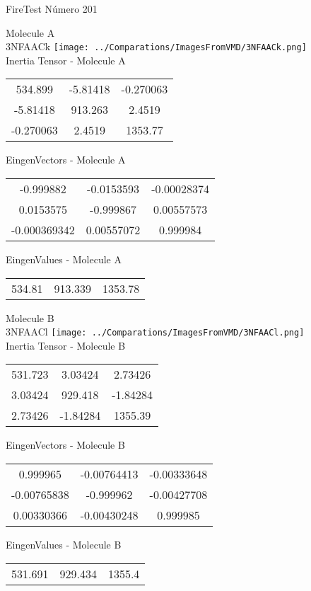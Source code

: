 \vtab[-2cm]
\begin{center}
{\large FireTest \tab Número 201}
\end{center}
\begin{multicols}{2}
\begin{center}

Molecule A \\ 
3NFAACk
\texttt{[image: ../Comparations/ImagesFromVMD/3NFAACk.png]}
\\
Inertia Tensor - Molecule A \\
\vtab

\begin{tabular}{|c c c|}
534.899	 & 	-5.81418	 & 	-0.270063	 \\
-5.81418	 & 	913.263	 & 	2.4519	 \\
-0.270063	 & 	2.4519	 & 	1353.77
\end{tabular}

\vtab
 EingenVectors - Molecule A     \\
\vtab
\begin{tabular}{|c c c|}
-0.999882	 & 	-0.0153593	 & 	-0.00028374	 \\
0.0153575	 & 	-0.999867	 & 	0.00557573	 \\
-0.000369342	 & 	0.00557072	 & 	0.999984
\end{tabular}

\vtab
 EingenValues - Molecule A     \\
\vtab
\begin{tabular}{|c c c|}
534.81	 & 	913.339	 & 	1353.78	 \\
\end{tabular}
\columnbreak

Molecule B \\ 
3NFAACl
\texttt{[image: ../Comparations/ImagesFromVMD/3NFAACl.png]}
\\
Inertia Tensor - Molecule B \\
\vtab

\begin{tabular}{|c c c|}
531.723	 & 	3.03424	 & 	2.73426	 \\
3.03424	 & 	929.418	 & 	-1.84284	 \\
2.73426	 & 	-1.84284	 & 	1355.39
\end{tabular}

\vtab
 EingenVectors - Molecule B     \\
\vtab
\begin{tabular}{|c c c|}
0.999965	 & 	-0.00764413	 & 	-0.00333648	 \\
-0.00765838	 & 	-0.999962	 & 	-0.00427708	 \\
0.00330366	 & 	-0.00430248	 & 	0.999985
\end{tabular}

\vtab
 EingenValues - Molecule B     \\
\vtab
\begin{tabular}{|c c c|}
531.691	 & 	929.434	 & 	1355.4	 \\
\end{tabular}

\end{center}
\end{multicols}
